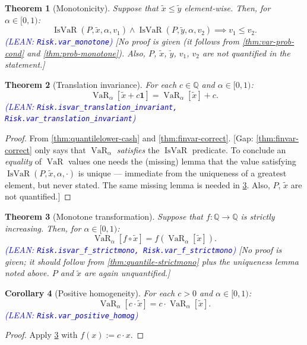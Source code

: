 \documentclass[letterpaper]{article}
\theoremstyle{plain}
\newtheorem{theorem}{Theorem}[subsection]
\newtheorem{corollary}[theorem]{Corollary}
\theoremstyle{definition}
\theoremstyle{remark}
\DeclareMathOperator{\finvar}{VaR}
\DeclareMathOperator{\isvar}{IsVaR}
\newcommand{\cc}[1]{\textcolor{ccolor}{[#1]}}
\newcommand{\lean}[1]{\textcolor{blue}{(\emph{LEAN}: \texttt{#1})}}
\newcommand{\leanok}{}
\begin{document}
\begin{theorem}[Monotonicity] \label{thm:var-monotone}
Suppose that $\tilde{x} \le \tilde{y}$ element-wise. Then, for $\alpha\in [0,1)$:
  \[
    \isvar(P,\tilde{x},\alpha, v_1) \wedge \isvar(P,\tilde{y},\alpha, v_2)
    \implies
    v_1 \le v_2.
  \]
  \lean{Risk.var\_monotone} \leanok
  \cc{No proof is given (it follows from \cref{thm:var-prob-cond} and \cref{thm:prob-monotone}). Also, $P$, $\tilde{x}$, $\tilde{y}$, $v_1$, $v_2$ are not quantified in the statement.}
\end{theorem}

\begin{theorem}[Translation invariance] \label{thm:var-translation}
For each $c\in \mathbb{Q}$ and $\alpha\in [0,1)$:
  \[
    \finvar_{\alpha}\left[ \tilde{x} + c \bm{1} \right]
    =
    \finvar_{\alpha}\left[ \tilde{x} \right] + c.
  \]
  \lean{Risk.isvar\_translation\_invariant, Risk.var\_translation\_invariant} \leanok
\end{theorem}
\begin{proof}
From \cref{thm:quantilelower-cash} and \cref{thm:finvar-correct}.
\cc{Gap: \cref{thm:finvar-correct} only says that $\finvar_{\alpha}$ \emph{satisfies} the $\isvar$ predicate. To conclude an \emph{equality} of $\finvar$ values one needs the (missing) lemma that the value satisfying $\isvar(P,\tilde{x},\alpha,\cdot)$ is unique --- immediate from the uniqueness of a greatest element, but never stated. The same missing lemma is needed in \cref{thm:var-strictmono}. Also, $P$, $\tilde{x}$ are not quantified.}
\end{proof}

\begin{theorem}[Monotone transformation] \label{thm:var-strictmono}
Suppose that $f\colon \mathbb{Q} \to \mathbb{Q}$ is strictly increasing. Then, for $\alpha\in [0,1)$:
  \[
    \finvar_{\alpha}\left[ f \circ \tilde{x} \right]
    =
    f\left( \finvar_{\alpha}\left[ \tilde{x} \right] \right).
  \]
  \lean{Risk.isvar\_f\_strictmono, Risk.var\_f\_strictmono} \leanok
  \cc{No proof is given; it should follow from \cref{thm:quantile-strictmono} plus the uniqueness lemma noted above. $P$ and $\tilde{x}$ are again unquantified.}
\end{theorem}

\begin{corollary}[Positive homogeneity] \label{thm:var-homog}
For each $c > 0$ and $\alpha\in [0,1)$:
  \[
    \finvar_{\alpha}\left[ c \cdot \tilde{x} \right]
    =
    c \cdot \finvar_{\alpha}\left[ \tilde{x} \right].
  \]
  \lean{Risk.var\_positive\_homog} \leanok
\end{corollary}
\begin{proof}
Apply \cref{thm:var-strictmono} with $f(x) := c\cdot x$.
\end{proof}
\end{document}
